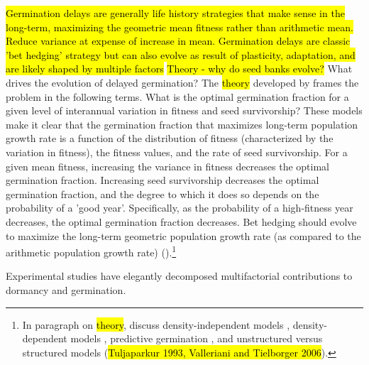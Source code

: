 \documentclass[12pt, oneside, titlepage]{article}   	%
\begin{document}
\hl{Germination delays are generally life history strategies that make sense in the long-term, maximizing the geometric mean fitness rather than arithmetic mean. Reduce variance at expense of increase in mean. Germination delays are classic 'bet hedging' strategy but can also evolve as result of plasticity, adaptation, and are likely shaped by multiple factors} \hl{Theory - why do seed banks evolve?} What drives the evolution of delayed germination? The \hl{theory} developed by \cite{cohen1966} frames the problem in the following terms. What is the optimal germination fraction for a given level of interannual variation in fitness and seed survivorship? These models make it clear that the germination fraction that maximizes long-term population growth rate is a function of the distribution of fitness (characterized by the variation in fitness), the fitness values, and the rate of seed survivorship. For a given mean fitness, increasing the variance in fitness decreases the optimal germination fraction. Increasing seed survivorship decreases the optimal germination fraction, and the degree to which it does so depends on the probability of a 'good year'. Specifically, as the probability of a high-fitness year decreases, the optimal germination fraction decreases. Bet hedging should evolve to maximize the long-term geometric population growth rate (as compared to the arithmetic population growth rate) (\cite{cohen1966,cohen1968,ellner1985,ellner1985a}).\footnote{In paragraph on \hl{theory}, discuss density-independent models \cite{cohen1966,cohen1968}, density-dependent models \cite{ellner1985,ellner1985a}, predictive germination \cite{cohen1967}, and unstructured versus structured models \cite{easterling2000} (\hl{Tuljaparkur 1993, Valleriani and Tielborger 2006}).}

Experimental studies have elegantly decomposed multifactorial contributions to dormancy and germination. 
\end{document}
